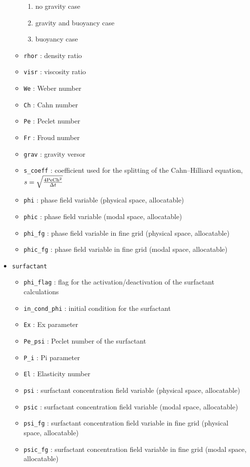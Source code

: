 \begin{itemize}
\begin{itemize}
\begin{enumerate}
\item no gravity case
\item gravity and buoyancy case
\item buoyancy case
\end{enumerate}
\item \texttt{rhor} : density ratio
\item \texttt{visr}  : viscosity ratio
\item \texttt{We} : Weber number
\item \texttt{Ch} : Cahn number
\item \texttt{Pe} : Peclet number
\item \texttt{Fr} : Froud number
\item \texttt{grav} : gravity versor
\item \texttt{s\_coeff} : coefficient used for the splitting of the Cahn--Hilliard equation, $s=\sqrt{\frac{4\textnormal{Pe}\textnormal{Ch}^2}{\Delta t}}$
\item \texttt{phi} : phase field variable (physical space, allocatable)
\item \texttt{phic} : phase field variable (modal space, allocatable)
\item \texttt{phi\_fg} : phase field variable in fine grid (physical space, allocatable)
\item \texttt{phic\_fg} : phase field variable in fine grid (modal space, allocatable)
\end{itemize}

\item \texttt{surfactant}
\begin{itemize}
\item \texttt{phi\_flag} : flag for the activation/deactivation of the surfactant calculations
\item \texttt{in\_cond\_phi} : initial condition for the surfactant
\item \texttt{Ex} : Ex parameter 
\item \texttt{Pe\_psi} : Peclet number of the surfactant
\item \texttt{P\_i} : Pi parameter 
\item \texttt{El} : Elasticity number
\item \texttt{psi} : surfactant concentration field variable (physical space, allocatable)
\item \texttt{psic} : surfactant concentration field variable (modal space, allocatable)
\item \texttt{psi\_fg} : surfactant concentration field variable in fine grid (physical space, allocatable)
\item \texttt{psic\_fg} : surfactant concentration field variable in fine grid (modal space, allocatable)
\end{itemize}


\end{itemize}
